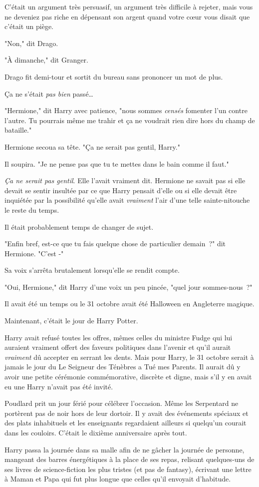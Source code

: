 C'était un argument très persuasif, un argument très difficile à rejeter, mais vous ne deveniez pas riche en dépensant son argent quand votre cœur vous disait que c'était un piège.

"Non," dit Drago.

"À dimanche," dit Granger.

Drago fit demi-tour et sortit du bureau sans prononcer un mot de plus.

Ça ne s'était \emph{pas bien} passé…

\later

"Hermione," dit Harry avec patience, "nous sommes \emph{censés} fomenter l'un contre l'autre. Tu pourrais même me trahir et ça ne voudrait rien dire hors du champ de bataille."

Hermione secoua sa tête. "Ça ne serait pas gentil, Harry."

Il soupira. "Je ne pense pas que tu te mettes dans le bain comme il faut."

\emph{Ça ne serait pas gentil}. Elle l'avait vraiment dit. Hermione ne savait pas si elle devait se sentir insultée par ce que Harry pensait d'elle ou si elle devait être inquiétée par la possibilité qu'elle avait \emph{vraiment} l'air d'une telle sainte-nitouche le reste du temps.

Il était probablement temps de changer de sujet.

"Enfin bref, est-ce que tu fais quelque chose de particulier demain~?" dit Hermione. "C'est -"

Sa voix s'arrêta brutalement lorsqu'elle se rendit compte.

"Oui, Hermione," dit Harry d'une voix un peu pincée, "quel jour sommes-nous~?"


Il avait été un temps ou le 31 octobre avait été Halloween en Angleterre magique.

Maintenant, c'était le jour de Harry Potter.

Harry avait refusé toutes les offres, mêmes celles du ministre Fudge qui lui auraient vraiment offert des faveurs politiques dans l'avenir et qu'il aurait \emph{vraiment} dû accepter en serrant les dents. Mais pour Harry, le 31 octobre serait à jamais le jour du Le Seigneur des Ténèbres a Tué mes Parents. Il aurait dû y avoir une petite cérémonie commémorative, discrète et digne, mais s'il y en avait eu une Harry n'avait pas été invité.

Poudlard prit un jour férié pour célébrer l'occasion. Même les Serpentard ne portèrent pas de noir hors de leur dortoir. Il y avait des événements spéciaux et des plats inhabituels et les enseignants regardaient ailleurs si quelqu'un courait dans les couloirs. C'était le dixième anniversaire après tout.

Harry passa la journée dans sa malle afin de ne gâcher la journée de personne, mangeant des barres énergétiques à la place de ses repas, relisant quelques-uns de ses livres de science-fiction les plus tristes (et pas de fantasy), écrivant une lettre à Maman et Papa qui fut plus longue que celles qu'il envoyait d'habitude.

